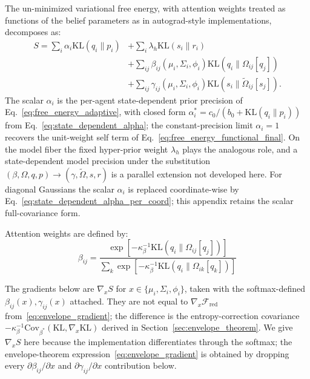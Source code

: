 \documentclass[11pt]{article}
\begin{document}
The un-minimized variational free energy, with attention weights treated as functions of the belief parameters as in autograd-style implementations, decomposes as:
\begin{equation}
\begin{aligned}
S = \sum_i \alpha_i \mathrm{KL}(q_i \| p_i) &+ \sum_i \lambda_h \mathrm{KL}(s_i \| r_i) \\
 &+ \sum_{ij} \beta_{ij}(\mu_i, \Sigma_i, \phi_i) \mathrm{KL}(q_i \| \Omega_{ij}[q_j]) \\
 &+ \sum_{ij} \gamma_{ij}(\mu_i, \Sigma_i, \phi_i) \mathrm{KL}(s_i \| \tilde{\Omega}_{ij}[s_j]).
\end{aligned}
\end{equation}
The scalar $\alpha_i$ is the per-agent state-dependent prior precision of Eq.~\eqref{eq:free_energy_adaptive}, with closed form $\alpha_i^* = c_0/(b_0 + \mathrm{KL}(q_i \| p_i))$ from Eq.~\eqref{eq:state_dependent_alpha}; the constant-precision limit $\alpha_i = 1$ recovers the unit-weight self term of Eq.~\eqref{eq:free_energy_functional_final}. On the model fiber the fixed hyper-prior weight $\lambda_h$ plays the analogous role, and a state-dependent model precision under the substitution $(\beta, \Omega, q, p) \to (\gamma, \tilde\Omega, s, r)$ is a parallel extension not developed here. For diagonal Gaussians the scalar $\alpha_i$ is replaced coordinate-wise by Eq.~\eqref{eq:state_dependent_alpha_per_coord}; this appendix retains the scalar full-covariance form.

Attention weights are defined by:
\begin{equation}
\beta_{ij} = \frac{\exp\left[-\kappa_\beta^{-1}\mathrm{KL}(q_i \| \Omega_{ij}[q_j])\right]}{\sum_k \exp\left[-\kappa_\beta^{-1}\mathrm{KL}(q_i \| \Omega_{ik}[q_k])\right]}
\end{equation}

The gradients below are $\nabla_x S$ for $x \in \{\mu_i, \Sigma_i, \phi_i\}$, taken with the softmax-defined $\beta_{ij}(x), \gamma_{ij}(x)$ attached. They are not equal to $\nabla_x \mathcal{F}_{\mathrm{red}}$ from~\eqref{eq:envelope_gradient}; the difference is the entropy-correction covariance $-\kappa_\beta^{-1}\mathrm{Cov}_{\beta^*}(\mathrm{KL}, \nabla_x \mathrm{KL})$ derived in Section~\ref{sec:envelope_theorem}. We give $\nabla_x S$ here because the implementation differentiates through the softmax; the envelope-theorem expression~\eqref{eq:envelope_gradient} is obtained by dropping every $\partial \beta_{ij}/\partial x$ and $\partial \gamma_{ij}/\partial x$ contribution below.
\end{document}
